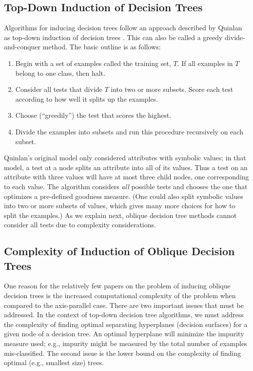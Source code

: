 \subsection{Top-Down Induction of Decision Trees}
Algorithms for inducing decision trees follow an approach
described by Quinlan as top-down induction of decision trees 
\citeyear{quinlan/86}.  This can also be called a greedy
divide-and-conquer method.  The basic outline is as follows:
\begin{enumerate}
\itemsep -0.0in
\item Begin with a set of examples called the training set, $T$.
If all examples in $T$ belong to one class, then halt.  
\item Consider all tests that divide $T$ into two or more subsets.
Score each test according to how well it splits up the examples.
\item Choose (``greedily'') the test that scores the highest.
\item Divide the examples into subsets and run this procedure 
recursively on each subset.
\end{enumerate}
Quinlan's original model only considered attributes with symbolic
values; in that model, a test at a node splits an attribute into all
of its values.  Thus a test on an attribute with three values will
have at most three child nodes, one corresponding to each value.  The
algorithm considers {\it all} possible tests and chooses
the one that optimizes a pre-defined goodness measure.  (One could
also split symbolic values into two or more subsets of values, which
gives many more choices for how to split the examples.)  As we explain
next, oblique decision tree methods cannot consider all tests due to
complexity considerations.

\subsection{Complexity of Induction of Oblique Decision Trees}

One reason for the relatively few papers on the problem of inducing
oblique decision trees is the increased computational complexity of
the problem when compared to the axis-parallel case.  There are two
important issues that must be addressed.  In the context of top-down
decision tree algorithms, we must address the complexity of finding
optimal separating hyperplanes (decision surfaces) for a given node of
a decision tree.  An optimal hyperplane will minimize the impurity
measure used; e.g., impurity might be measured by the total number of
examples mis-classified.  The second issue is the lower bound on the
complexity of finding optimal (e.g., smallest size) trees.

